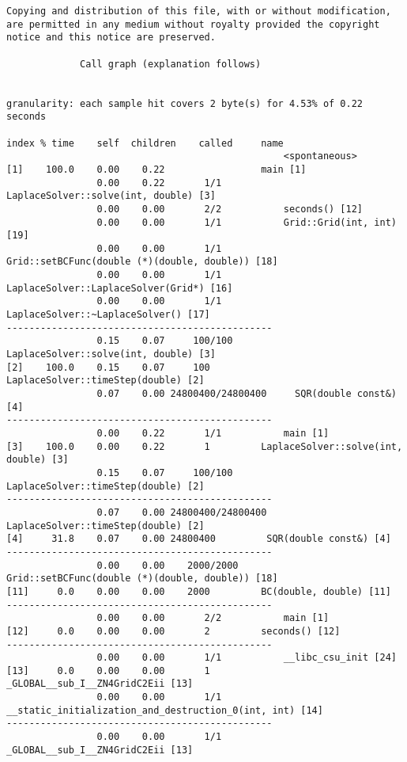 \documentclass[a4paper,twosidep]{article}
\begin{document}
\begin{verbatim}
Copying and distribution of this file, with or without modification,
are permitted in any medium without royalty provided the copyright
notice and this notice are preserved.

		     Call graph (explanation follows)


granularity: each sample hit covers 2 byte(s) for 4.53% of 0.22 seconds

index % time    self  children    called     name
                                                 <spontaneous>
[1]    100.0    0.00    0.22                 main [1]
                0.00    0.22       1/1           LaplaceSolver::solve(int, double) [3]
                0.00    0.00       2/2           seconds() [12]
                0.00    0.00       1/1           Grid::Grid(int, int) [19]
                0.00    0.00       1/1           Grid::setBCFunc(double (*)(double, double)) [18]
                0.00    0.00       1/1           LaplaceSolver::LaplaceSolver(Grid*) [16]
                0.00    0.00       1/1           LaplaceSolver::~LaplaceSolver() [17]
-----------------------------------------------
                0.15    0.07     100/100         LaplaceSolver::solve(int, double) [3]
[2]    100.0    0.15    0.07     100         LaplaceSolver::timeStep(double) [2]
                0.07    0.00 24800400/24800400     SQR(double const&) [4]
-----------------------------------------------
                0.00    0.22       1/1           main [1]
[3]    100.0    0.00    0.22       1         LaplaceSolver::solve(int, double) [3]
                0.15    0.07     100/100         LaplaceSolver::timeStep(double) [2]
-----------------------------------------------
                0.07    0.00 24800400/24800400     LaplaceSolver::timeStep(double) [2]
[4]     31.8    0.07    0.00 24800400         SQR(double const&) [4]
-----------------------------------------------
                0.00    0.00    2000/2000        Grid::setBCFunc(double (*)(double, double)) [18]
[11]     0.0    0.00    0.00    2000         BC(double, double) [11]
-----------------------------------------------
                0.00    0.00       2/2           main [1]
[12]     0.0    0.00    0.00       2         seconds() [12]
-----------------------------------------------
                0.00    0.00       1/1           __libc_csu_init [24]
[13]     0.0    0.00    0.00       1         _GLOBAL__sub_I__ZN4GridC2Eii [13]
                0.00    0.00       1/1           __static_initialization_and_destruction_0(int, int) [14]
-----------------------------------------------
                0.00    0.00       1/1           _GLOBAL__sub_I__ZN4GridC2Eii [13]

\end{verbatim}
\end{document}

